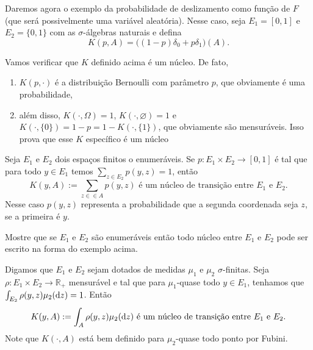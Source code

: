 \begin{example}
  \label{x:chance_deslizamento}
  Daremos agora o exemplo da probabilidade de deslizamento como função de $F$ (que será possivelmente uma variável aleatória).
  Nesse caso, seja $E_1 = [0,1]$ e $E_2 = \{0,1\}$ com as $\sigma$-álgebras naturais e defina
  \begin{equation}
    K(p, A) = \big( (1-p)\delta_0 + p \delta_1 \big) (A).
  \end{equation}
\end{example}

Vamos verificar que $K$ definido acima é um núcleo.
De fato,
\begin{enumerate}[\quad i)]
\item $K(p, \cdot)$ é a distribuição Bernoulli com parâmetro $p$, que obviamente é uma probabilidade,
\item além disso, $K(\cdot, \Omega) = 1$, $K(\cdot, \varnothing) = 1$ e $K(\cdot, \{0\}) = 1-p = 1 - K(\cdot,\{1\})$, que obviamente são mensuráveis.
Isso prova que esse $K$ específico é um núcleo
\end{enumerate}

\begin{example}[Discreto]
  \label{x:nucleo_discreto}
  Seja $E_1$ e $E_2$ dois espaços finitos o enumeráveis.
  Se $p: E_1 \times E_2 \to [0,1]$ é tal que para todo $y \in E_1$ temos $\sum_{z\in E_2} p(y, z) = 1$, então
  \begin{equation}
    K(y, A) := \sum_{z\in \in A} p(y, z) \text{ é um núcleo de transição entre $E_1$ e $E_2$.}
  \end{equation}
  Nesse caso $p(y,z)$ representa a probabilidade que a segunda coordenada seja $z$, se a primeira é $y$.
\end{example}

\begin{exercise}
  Mostre que se $E_1$ e $E_2$ são enumeráveis então todo núcleo entre $E_1$ e $E_2$ pode ser escrito na forma do exemplo acima.
\end{exercise}

\begin{example}
  Digamos que $E_1$ e $E_2$ sejam dotados de medidas $\mu_1$ e $\mu_2$ $\sigma$-finitas.
  Seja $\rho: E_1 \times E_2 \to \mathbb{R}_+$ mensurável e tal que para $\mu_1$-quase todo $y \in E_1$, tenhamos que $\int_{E_2} \rho(y, z) \mu_2(\mathop{}\!\mathrm{d} z) = 1$.
  Então
  \begin{equation}
    K(y, A) := \int_A \rho(y, z) \mu_2(\mathop{}\!\mathrm{d} z) \text{ é um núcleo de transição entre $E_1$ e $E_2$.}
  \end{equation}
  Note que $K(\cdot, A)$ está bem definido para $\mu_2$-quase todo ponto por Fubini.
\end{example}

